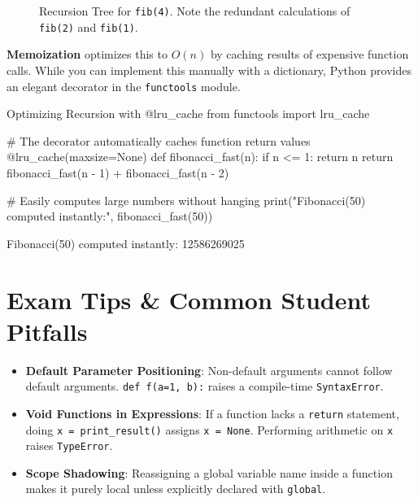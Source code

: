 \begin{figure}[htbp]
\centering
{}
\caption{Recursion Tree for \texttt{fib(4)}. Note the redundant calculations of \texttt{fib(2)} and \texttt{fib(1)}.}
\label{fig:fib-tree}
\end{figure}

\textbf{Memoization} optimizes this to $O(n)$ by caching results of expensive function calls. While you can implement this manually with a dictionary, Python provides an elegant decorator in the \texttt{functools} module.

\begin{pythoncode}{Optimizing Recursion with @lru\_cache}
from functools import lru_cache

# The decorator automatically caches function return values
@lru_cache(maxsize=None)
def fibonacci_fast(n):
    if n <= 1:
        return n
    return fibonacci_fast(n - 1) + fibonacci_fast(n - 2)

# Easily computes large numbers without hanging
print("Fibonacci(50) computed instantly:", fibonacci_fast(50))
\end{pythoncode}

\begin{outputbox}
Fibonacci(50) computed instantly: 12586269025
\end{outputbox}


\section{Exam Tips \& Common Student Pitfalls}

\begin{examtip}
\begin{itemize}[leftmargin=1.5em]
    \item \textbf{Default Parameter Positioning}: Non-default arguments cannot follow default arguments. \texttt{def f(a=1, b):} raises a compile-time \texttt{SyntaxError}.
    \item \textbf{Void Functions in Expressions}: If a function lacks a \texttt{return} statement, doing \texttt{x = print\_result()} assigns \texttt{x = None}. Performing arithmetic on \texttt{x} raises \texttt{TypeError}.
    \item \textbf{Scope Shadowing}: Reassigning a global variable name inside a function makes it purely local unless explicitly declared with \texttt{global}.
\end{itemize}
\end{examtip}

